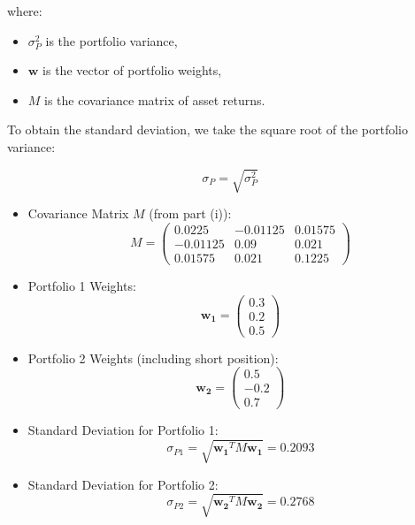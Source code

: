 \documentclass{article}
\begin{document}
where:
\begin{itemize}
    \item \( \sigma_P^2 \) is the portfolio variance,
    \item \( \mathbf{w} \) is the vector of portfolio weights,
    \item \( M \) is the covariance matrix of asset returns.
\end{itemize}

To obtain the standard deviation, we take the square root of the portfolio variance:

\[
    \sigma_P = \sqrt{\sigma_P^2}
\]

\begin{itemize}
    \item Covariance Matrix \( M \) (from part (i)):
          \[
              M = \begin{pmatrix}
                  0.0225   & -0.01125 & 0.01575 \\
                  -0.01125 & 0.09     & 0.021   \\
                  0.01575  & 0.021    & 0.1225
              \end{pmatrix}
          \]

    \item Portfolio 1 Weights:
          \[
              \mathbf{w_1} = \begin{pmatrix} 0.3 \\ 0.2 \\ 0.5 \end{pmatrix}
          \]

    \item Portfolio 2 Weights (including short position):
          \[
              \mathbf{w_2} = \begin{pmatrix} 0.5 \\ -0.2 \\ 0.7 \end{pmatrix}
          \]
\end{itemize}

\begin{itemize}
    \item Standard Deviation for Portfolio 1:
          \[
              \sigma_{P1} = \sqrt{\mathbf{w_1}^T M \mathbf{w_1}} = 0.2093
          \]

    \item Standard Deviation for Portfolio 2:
          \[
              \sigma_{P2} = \sqrt{\mathbf{w_2}^T M \mathbf{w_2}} = 0.2768
          \]
\end{itemize}
\end{document}
